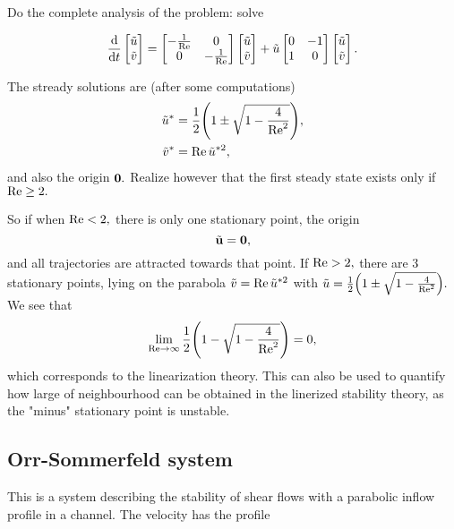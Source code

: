 \documentclass[../main.tex]{subfiles}
\begin{document}
Do the complete analysis of the problem: solve

\[
	\dv{t} \begin{bmatrix}
		\tilde{u} \\
		\tilde{v}
	\end{bmatrix}
	= \begin{bmatrix}
		- \frac{1}{\mathrm{Re}} & 0 \\
		0 & - \frac{1}{\mathrm{Re}}
	\end{bmatrix}
	\begin{bmatrix}
		\tilde{u} \\
		\tilde{v}
	\end{bmatrix}
	+ \tilde{u} \begin{bmatrix}
		0 & -1 \\
		1 & 0
	\end{bmatrix}
	\begin{bmatrix}
		\tilde{u} \\
		\tilde{v}
	\end{bmatrix}.
\]

The stready solutions are (after some computations)
\begin{align*}
	\tilde{u}^* &= \frac{1}{2}\qty(1 \pm \sqrt{1-\frac{4}{\mathrm{Re}^{2}}}), \\
	\tilde{v}^{*} &= \mathrm{Re} \, \tilde{u}^{*2},
\end{align*}
and also the origin $\vb{0}.$ Realize however that the first steady state exists only if $\mathrm{Re} \geq 2.$

So if when $\mathrm{Re} < 2, $ there is only one stationary point, the origin
\[
	\tilde{\vb{u}} = \vb{0},
\]
and all trajectories are attracted towards that point. If $\mathrm{Re} > 2,$ there are 3 stationary points, lying on the parabola $\tilde{v} = \mathrm{Re} \, \tilde{u}^{*2}$ with $\tilde{u} = \frac{1}{2}\qty(1 \pm \sqrt{1-\frac{4}{\mathrm{Re}^{2}}}).$ We see that 
\[
	\lim_{\mathrm{Re} \to \infty}\frac{1}{2}\qty(1 - \sqrt{1-\frac{4}{\mathrm{Re}^{2}}}) = 0,
\]
which corresponds to the linearization theory. This can also be used to quantify how large of neighbourhood can be obtained in the linerized stability theory, as the "minus" stationary point is unstable.

\subsection{Orr-Sommerfeld system}
\label{sec:orr_sommerfeld}
This is a system describing the stability of shear flows with a parabolic inflow profile in a channel. The velocity has the profile
\end{document}
